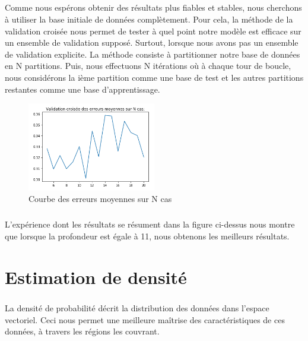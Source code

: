 \documentclass{report}
\begin{document}
\paragraph{}
Comme nous espérons obtenir des résultats plus fiables et stables, nous cherchons à utiliser la base initiale de données complètement. Pour cela, la méthode de la validation croisée nous permet de tester à quel point notre modèle est efficace sur un ensemble de validation supposé. Surtout, lorsque nous avons pas un ensemble de validation explicite. La méthode consiste à partitionner notre base de données en N partitions. Puis, nous effectuons N itérations où à chaque tour de boucle, nous considérons la ième partition comme une base de test et les autres partitions restantes comme une base d'apprentissage.

\begin{figure}[H]
  \begin{center}
    \includegraphics[width=0.5\textwidth]{cross_courbe.png}
    \caption{Courbe des erreurs moyennes sur N cas}
  \end{center}
\end{figure}
\paragraph{}
L'expérience dont les résultats se résument dans la figure ci-dessus nous montre que lorsque la profondeur est égale à 11, nous obtenons les meilleurs résultats.

\chapter{Estimation de densité}
\paragraph{}
La densité de probabilité décrit la distribution des données dans l'espace vectoriel. Ceci nous permet une meilleure maîtrise des caractéristiques de ces données, à travers les régions les couvrant.
\end{document}
